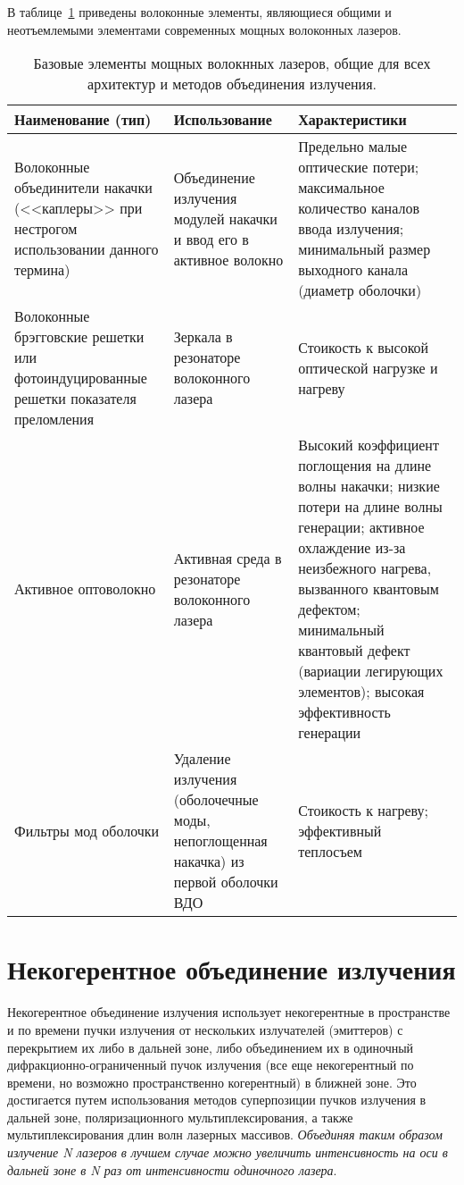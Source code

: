 В таблице~\ref{tbl_base_elem} приведены волоконные элементы, являющиеся общими и неотъемлемыми элементами современных мощных волоконных лазеров.
\begin{table} [htbp]
  \centering
  \parbox{15cm}{\caption{Базовые элементы мощных волокнных лазеров, общие для всех архитектур и методов объединения излучения.}
  \label{tbl_base_elem}}
  \begin{center}
  \begin{tabular}{| p{5cm} | p{5cm} | p{5cm} |}
  \hline
  \hline
  Наименование (тип)   & Использование & Характеристики \\
  \hline
  \hline
  Волоконные объединители накачки (<<каплеры>> при нестрогом использовании данного термина) & Объединение излучения модулей накачки и ввод его в активное волокно & Предельно малые оптические потери; максимальное количество каналов ввода излучения; минимальный размер выходного канала (диаметр оболочки)  \\
  \hline
  Волоконные брэгговские решетки или фотоиндуцированные решетки показателя преломления & Зеркала в резонаторе волоконного лазера   & Стоикость к высокой оптической нагрузке и нагреву \\
  \hline
  Активное оптоволокно & Активная среда в резонаторе волоконного лазера   & Высокий коэффициент поглощения на длине волны накачки; низкие потери на длине волны генерации; активное охлаждение из-за неизбежного нагрева, вызванного квантовым дефектом; минимальный квантовый дефект (вариации легирующих элементов); высокая эффективность генерации \\
  \hline
  Фильтры мод оболочки & Удаление излучения (оболочечные моды, непоглощенная накачка) из первой оболочки ВДО & Стоикость к  нагреву; эффективный теплосъем   \\
  \hline
  \hline
  \end{tabular}
  \end{center}
\end{table}


\section{Некогерентное объединение излучения}

Некогерентное объединение излучения использует  некогерентные в пространстве и по времени пучки излучения от нескольких излучателей (эмиттеров) с перекрытием их либо в дальней зоне, либо объединением их в одиночный дифракционно-ограниченный пучок излучения (все еще некогерентный по времени, но возможно пространственно когерентный) в ближней зоне. Это достигается путем использования методов суперпозиции пучков излучения в дальней зоне, поляризационного мультиплексирования, а также мультиплексирования длин волн лазерных массивов. \textit{Объединяя таким образом излучение N лазеров в лучшем случае можно увеличить интенсивность на оси в дальней зоне в N раз от интенсивности одиночного лазера}.


